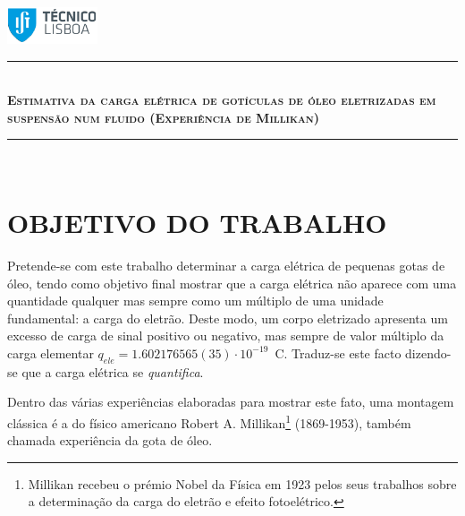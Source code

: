 \documentclass[a4paper,twoside,12pt]{article}      %
\author{Prof. Bernardo B. Carvalho}
\date{ Setembro 2012}
\newcommand{\HRule}{\rule{\linewidth}{0.5mm}}
\begin{document}
 

	\includegraphics[width=0.2\textwidth]{../../logo-ist}%

		\HRule \\[0.5cm]
	{ \large \bfseries   \textsc{Estimativa da carga elétrica de 
		gotículas de óleo eletrizadas em suspensão num fluido (Experiência de Millikan)} }\\[0.4cm] %
	\HRule \\%




\section{\sf OBJETIVO DO TRABALHO}
Pretende-se com este trabalho determinar a carga elétrica de pequenas gotas de óleo, tendo como objetivo final mostrar que a carga elétrica não aparece com uma quantidade qualquer mas sempre como um múltiplo de uma unidade fundamental: a carga do eletrão. Deste modo, um corpo eletrizado apresenta um excesso de carga de sinal positivo ou negativo, mas sempre de valor múltiplo da carga elementar $q_{ele}= 1.602176565(35)\cdot 10^{-19}\,$ C.
Traduz-se este facto dizendo-se que a carga elétrica se \emph{quantifica}.

Dentro das várias experiências elaboradas para mostrar este fato, uma montagem clássica é a do físico americano Robert A. Millikan\footnote{Millikan recebeu o prémio Nobel da Física em 1923 pelos seus trabalhos sobre a determinação da carga do eletrão e efeito fotoelétrico.} (1869-1953), também chamada experiência da gota de óleo.
\end{document}
